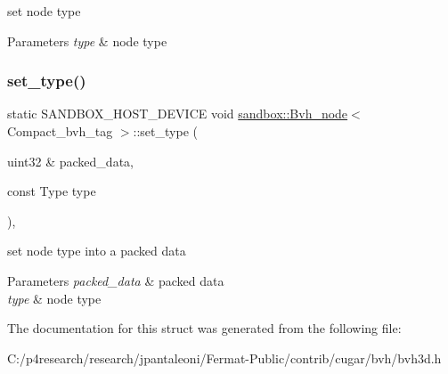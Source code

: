 set node type


\begin{DoxyParams}{Parameters}
{\em type} & node type \\
\hline
\end{DoxyParams}
\mbox{\label{structsandbox_1_1_bvh__node_3_01_compact__bvh__tag_01_4_ae81939099d3fe8a4cbafbde56c148fa5}} 
\subsubsection{\texorpdfstring{set\+\_\+type()}{set\_type()}\hspace{0.1cm}{\footnotesize\ttfamily [2/2]}}
{\footnotesize\ttfamily static S\+A\+N\+D\+B\+O\+X\+\_\+\+H\+O\+S\+T\+\_\+\+D\+E\+V\+I\+CE void \hyperlink{structsandbox_1_1_bvh__node}{sandbox\+::\+Bvh\+\_\+node}$<$ Compact\+\_\+bvh\+\_\+tag $>$\+::set\+\_\+type (\begin{DoxyParamCaption}\item[{uint32 \&}]{packed\+\_\+data,  }\item[{const Type}]{type }\end{DoxyParamCaption})\hspace{0.3cm}{\ttfamily [inline]}, {\ttfamily [static]}}

set node type into a packed data


\begin{DoxyParams}{Parameters}
{\em packed\+\_\+data} & packed data \\
\hline
{\em type} & node type \\
\hline
\end{DoxyParams}


The documentation for this struct was generated from the following file\+:\begin{DoxyCompactItemize}
\item 
C\+:/p4research/research/jpantaleoni/\+Fermat-\/\+Public/contrib/cugar/bvh/bvh3d.\+h\end{DoxyCompactItemize}

